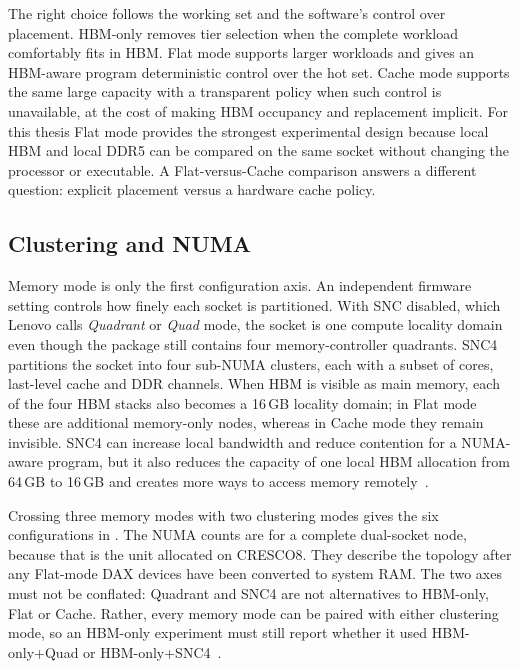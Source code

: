 The right choice follows the working set and the software's control over
placement.  HBM-only removes tier selection when the complete workload
comfortably fits in HBM.  Flat mode supports larger workloads and gives
an HBM-aware program deterministic control over the hot set.  Cache mode
supports the same large capacity with a transparent policy when such
control is unavailable, at the cost of making HBM occupancy and
replacement implicit.  For this thesis Flat mode provides the strongest
experimental design because local HBM and local DDR5 can be compared on
the same socket without changing the processor or executable.  A
Flat-versus-Cache comparison answers a different question: explicit
placement versus a hardware cache policy.

\subsection{Clustering and NUMA}
\label{sec:hbm-clustering}

Memory mode is only the first configuration axis.  An independent
firmware setting controls how finely each socket is partitioned.  With
SNC disabled, which Lenovo calls \emph{Quadrant} or \emph{Quad} mode,
the socket is one compute locality domain even though the package still
contains four memory-controller quadrants.  SNC4 partitions the socket
into four sub-NUMA clusters, each with a subset of cores, last-level
cache and DDR channels.  When HBM is visible as main memory, each of the
four HBM stacks also becomes a 16\,GB locality domain; in Flat mode these
are additional memory-only nodes, whereas in Cache mode they remain
invisible.  SNC4 can increase local bandwidth and reduce contention for
a NUMA-aware program, but it also reduces the capacity of one local HBM
allocation from 64\,GB to 16\,GB and creates more ways to access memory
remotely~\cite{lp1738,intelmaxtuning}.

Crossing three memory modes with two clustering modes gives the six
configurations in .  The NUMA counts
are for a complete dual-socket node, because that is the unit allocated
on CRESCO8.  They describe the topology after any Flat-mode DAX devices
have been converted to system RAM.  The two axes must not be conflated:
Quadrant and SNC4 are not alternatives to HBM-only, Flat or Cache.
Rather, every memory mode can be paired with either clustering mode, so
an HBM-only experiment must still report whether it used HBM-only+Quad
or HBM-only+SNC4~\cite{lp1738}.

